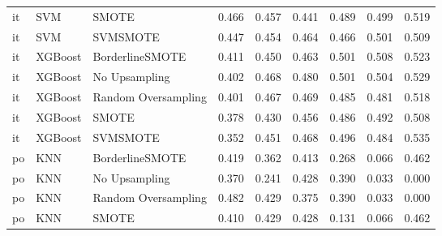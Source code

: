 \begin{tabular}{lllllllll}
      it &                          SVM &               SMOTE & 0.466 &                     0.457 &                 0.441 &                  0.489 &                                   0.499 &     0.519 \\
      it &                          SVM &            SVMSMOTE & 0.447 &                     0.454 &                 0.464 &                  0.466 &                                   0.501 &     0.509 \\
      it &                      XGBoost &     BorderlineSMOTE & 0.411 &                     0.450 &                 0.463 &                  0.501 &                                   0.508 &     0.523 \\
      it &                      XGBoost &       No Upsampling & 0.402 &                     0.468 &                 0.480 &                  0.501 &                                   0.504 &     0.529 \\
      it &                      XGBoost & Random Oversampling & 0.401 &                     0.467 &                 0.469 &                  0.485 &                                   0.481 &     0.518 \\
      it &                      XGBoost &               SMOTE & 0.378 &                     0.430 &                 0.456 &                  0.486 &                                   0.492 &     0.508 \\
      it &                      XGBoost &            SVMSMOTE & 0.352 &                     0.451 &                 0.468 &                  0.496 &                                   0.484 &     0.535 \\
      po &                          KNN &     BorderlineSMOTE & 0.419 &                     0.362 &                 0.413 &                  0.268 &                                   0.066 &     0.462 \\
      po &                          KNN &       No Upsampling & 0.370 &                     0.241 &                 0.428 &                  0.390 &                                   0.033 &     0.000 \\
      po &                          KNN & Random Oversampling & 0.482 &                     0.429 &                 0.375 &                  0.390 &                                   0.033 &     0.000 \\
      po &                          KNN &               SMOTE & 0.410 &                     0.429 &                 0.428 &                  0.131 &                                   0.066 &     0.462 \\

\end{tabular}
